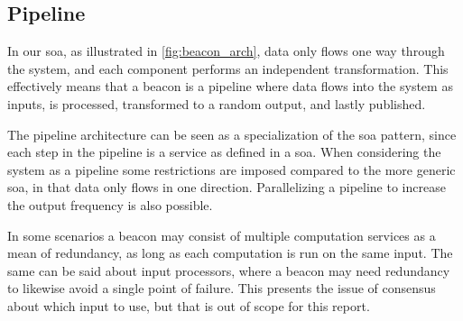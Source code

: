 \subsection{Pipeline}%
\label{sub:pipeline}
In our \gls{soa}, as illustrated in \cref{fig:beacon_arch}, data only flows one way through the system, and each component performs an independent transformation.
This effectively means that a beacon is a pipeline where data flows into the system as inputs, is processed, transformed to a random output, and lastly published.

The pipeline architecture can be seen as a specialization of the \gls{soa} pattern, since each step in the pipeline is a service as defined in a \gls{soa}. When considering the system as a pipeline some restrictions are imposed compared to the more generic \gls{soa}, in that data only flows in one direction.
Parallelizing a pipeline to increase the output frequency is also possible.

In some scenarios a beacon may consist of multiple computation services as a mean of redundancy, as long as each computation is run on the same input.
The same can be said about input processors, where a beacon may need redundancy to likewise avoid a single point of failure.
This presents the issue of consensus about which input to use, but that is out of scope for this report.
